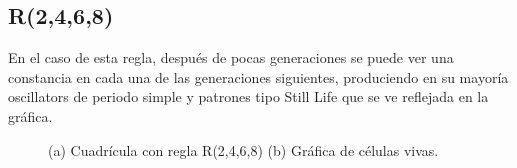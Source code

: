 \subsection{R(2,4,6,8)}
En el caso de esta regla, después de pocas generaciones se puede ver una constancia en cada una de las generaciones siguientes, produciendo en su mayoría oscillators de periodo simple y patrones tipo Still Life que se ve reflejada en la gráfica.
\begin{figure}[h]
	\centering
	\caption{(a) Cuadrícula con regla R(2,4,6,8) (b) Gráfica de células vivas.}
	\label{fig:R2468}
\end{figure}

\newpage

